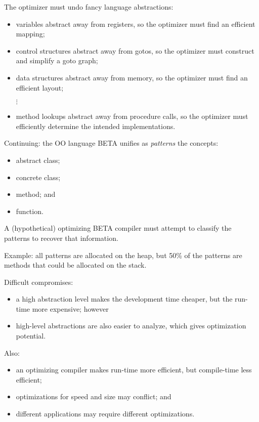 \begin{slide*}
The optimizer must undo fancy language abstractions:
\begin{itemize}
\item variables abstract away from registers, so the optimizer must find an efficient mapping;
\item control structures abstract away from gotos, so the optimizer must construct and
simplify a goto graph;
\item data structures abstract away from memory, so the optimizer must find an efficient layout;
\item[$\vdots$]
\item method lookups abstract away from procedure calls, so the optimizer must efficiently
determine the intended implementations.
\end{itemize}
\vfil
\end{slide*}
 
\begin{slide*}
Continuing: the OO language BETA unifies as {\em patterns\/} the concepts:
\begin{itemize}
\item abstract class;
\item concrete class;
\item method; and
\item function.
\end{itemize}
A (hypothetical) optimizing BETA compiler must attempt to classify the 
patterns to recover that information.

Example: all patterns are allocated on the heap, but 50\% of the patterns are methods
that could be allocated on the stack.
\vfil
\end{slide*}

\begin{slide*}
Difficult compromises:
\begin{itemize}
\item a high abstraction level makes the development time cheaper, but the run-time
more expensive; however
\item high-level abstractions are also easier to analyze, which gives
optimization potential.
\end{itemize}
Also:
\begin{itemize}
\item an optimizing compiler makes run-time more efficient, but compile-time less
efficient;
\item optimizations for speed and size may conflict; and
\item different applications may require different optimizations.
\end{itemize}
\vfil
\end{slide*}
 
